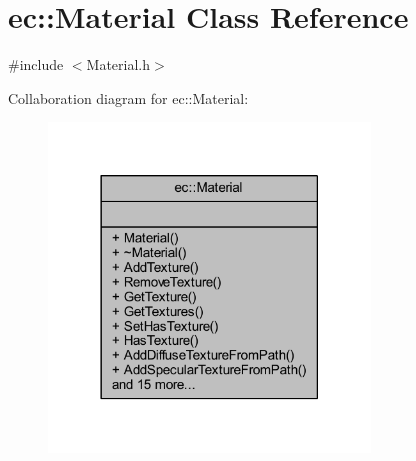 \hypertarget{classec_1_1_material}{}\section{ec\+:\+:Material Class Reference}
\label{classec_1_1_material}


{\ttfamily \#include $<$Material.\+h$>$}



Collaboration diagram for ec\+:\+:Material\+:\nopagebreak
\begin{figure}[H]
\begin{center}
\leavevmode
\includegraphics[width=242pt]{classec_1_1_material__coll__graph}
\end{center}
\end{figure}

